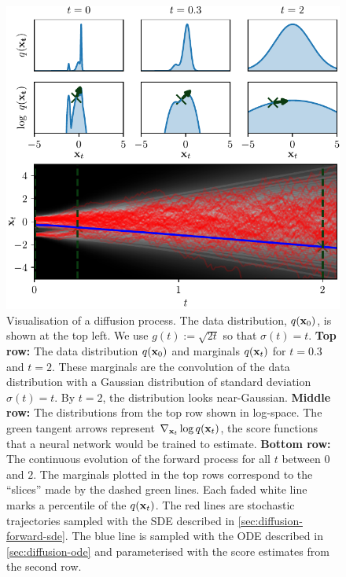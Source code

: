 \begin{figure}
    \centering
    \includegraphics[scale=1]{figs/thesis/diffusion_process.pdf}
    \caption{Visualisation of a diffusion process. The data distribution, $q({\mathbf{x}}_0)$, is shown at the top left. We use $g(t) := \sqrt{2t}$ so that $\sigma(t)     = t$. \textbf{Top row:} The data distribution $q({\mathbf{x}}_0)$ and marginals $q({\mathbf{x}}_t)$ for $t=0.3$ and $t=2$. These marginals are the convolution of the data distribution with a Gaussian distribution of standard deviation $\sigma(t) = t$. By $t=2$, the distribution looks near-Gaussian. \textbf{Middle row:} The distributions from the top row shown in log-space. The green tangent arrows represent $\nabla_{{\mathbf{x}}_t} \log q({\mathbf{x}}_t)$, the score functions that a neural network would be trained to estimate. \textbf{Bottom row:} The continuous evolution of the forward process for all $t$ between $0$ and $2$. The marginals plotted in the top rows correspond to the ``slices'' made by the dashed green lines. Each faded white line marks a percentile of the $q({\mathbf{x}}_t)$. The red lines are stochastic trajectories sampled with the SDE described in \cref{sec:diffusion-forward-sde}. The blue line is sampled with the ODE described in \cref{sec:diffusion-ode} and parameterised with the score estimates from the second row.}
    \label{fig:diffusion-overview}
\end{figure}



